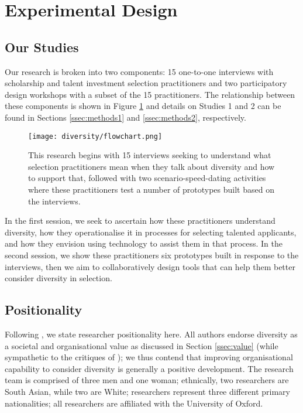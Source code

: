 \section{Experimental Design}\label{sec:methods}
\subsection{Our Studies}
Our research is broken into two components: 15 one-to-one interviews with scholarship and talent investment selection practitioners and two participatory design workshops with a subset of the 15 practitioners. The relationship between these components is shown in Figure \ref{fig:flowchart} and details on Studies 1 and 2 can be found in Sections \ref{ssec:methods1} and \ref{ssec:methods2}, respectively.

\begin{figure}[htbp]
    \centering
    \texttt{[image: diversity/flowchart.png]}
    \caption{This research begins with 15 interviews seeking to understand what selection practitioners mean when they talk about diversity and how to support that, followed with two scenario-speed-dating activities where these practitioners test a number of prototypes built based on the interviews.}
    \label{fig:flowchart}
\end{figure}

In the first session, we seek to ascertain how these practitioners understand diversity, how they operationalise it in processes for selecting talented applicants, and how they envision using technology to assist them in that process. In the second session, we show these practitioners six prototypes built in response to the interviews, then we aim to collaboratively design tools that can help them better consider diversity in selection.

\subsection{Positionality}
Following \textcite{venn-wycherley_realities_2024}, we state researcher positionality here. All authors endorse diversity as a societal and organisational value as discussed in Section \ref{ssec:value} (while sympathetic to the critiques of \textcite{Ahmed_2012,Warikoo_2019}); we thus contend that improving organisational capability to consider diversity is generally a positive development. The research team is comprised of three men and one woman; ethnically, two researchers are South Asian, while two are White; researchers represent three different primary nationalities; all researchers are affiliated with the University of Oxford.

